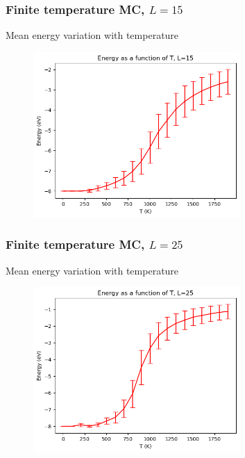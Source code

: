 \documentclass{beamer}
\begin{document}
\begin{frame}
    \frametitle{Finite temperature MC, $L=15$}

    \centering Mean energy variation with temperature

    \begin{figure}
        \includegraphics[width=0.7\textwidth]{images/cenergy15.png}
    \end{figure}

\end{frame}

\begin{frame}
    \frametitle{Finite temperature MC, $L=25$}

    \centering Mean energy variation with temperature

    \begin{figure}
        \includegraphics[width=0.7\textwidth]{images/cenergy25.png}
    \end{figure}

\end{frame}
\end{document}
